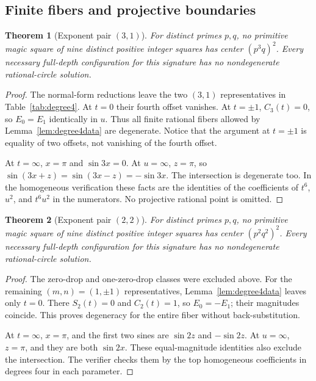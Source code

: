 \documentclass[11pt]{article}
\newtheorem{theorem}{Theorem}[section]
\theoremstyle{definition}\newtheorem{definition}[theorem]{Definition}
\theoremstyle{remark}\newtheorem{remark}[theorem]{Remark}
\begin{document}
\subsection{Finite fibers and projective boundaries}
\begin{theorem}[Exponent pair $(3,1)$]\label{thm:31}
For distinct primes $p,q$, no primitive magic square of nine distinct positive integer squares has center $(p^3q)^2$. Every necessary full-depth configuration for this signature has no nondegenerate rational-circle solution.
\end{theorem}
\begin{proof}
The normal-form reductions leave the two $(3,1)$ representatives in Table~\ref{tab:degree4}. At $t=0$ their fourth offset vanishes. At $t=\pm1$, $C_3(t)=0$, so $E_0=E_1$ identically in $u$. Thus all finite rational fibers allowed by Lemma~\ref{lem:degree4data} are degenerate. Notice that the argument at $t=\pm1$ is equality of two offsets, not vanishing of the fourth offset.

At $t=\infty$, $x=\pi$ and $\sin3x=0$. At $u=\infty$, $z=\pi$, so $\sin(3x+z)=\sin(3x-z)=-\sin3x$. The intersection is degenerate too. In the homogeneous verification these facts are the identities of the coefficients of $t^6$, $u^2$, and $t^6u^2$ in the numerators. No projective rational point is omitted.
\end{proof}

\begin{theorem}[Exponent pair $(2,2)$]\label{thm:22}
For distinct primes $p,q$, no primitive magic square of nine distinct positive integer squares has center $(p^2q^2)^2$. Every necessary full-depth configuration for this signature has no nondegenerate rational-circle solution.
\end{theorem}
\begin{proof}
The zero-drop and one-zero-drop classes were excluded above. For the remaining $(m,n)=(1,\pm1)$ representatives, Lemma~\ref{lem:degree4data} leaves only $t=0$. There $S_2(t)=0$ and $C_2(t)=1$, so $E_0=-E_1$; their magnitudes coincide. This proves degeneracy for the entire fiber without back-substitution.

At $t=\infty$, $x=\pi$, and the first two sines are $\sin2z$ and $-\sin2z$. At $u=\infty$, $z=\pi$, and they are both $\sin2x$. These equal-magnitude identities also exclude the intersection. The verifier checks them by the top homogeneous coefficients in degrees four in each parameter.
\end{proof}
\end{document}
